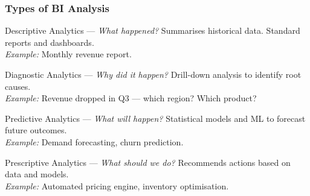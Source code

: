 \begin{frame}
  \frametitle{Types of BI Analysis}

  \begin{block}{Descriptive Analytics --- \textit{What happened?}}
    Summarises historical data. Standard reports and dashboards.\\
    \textit{Example:} Monthly revenue report.
  \end{block}

  \begin{block}{Diagnostic Analytics --- \textit{Why did it happen?}}
    Drill-down analysis to identify root causes.\\
    \textit{Example:} Revenue dropped in Q3 --- which region? Which product?
  \end{block}

  \begin{block}{Predictive Analytics --- \textit{What will happen?}}
    Statistical models and ML to forecast future outcomes.\\
    \textit{Example:} Demand forecasting, churn prediction.
  \end{block}

  \begin{block}{Prescriptive Analytics --- \textit{What should we do?}}
    Recommends actions based on data and models.\\
    \textit{Example:} Automated pricing engine, inventory optimisation.
  \end{block}
\end{frame}

